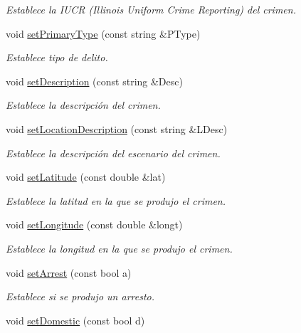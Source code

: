 \begin{DoxyCompactItemize}
\begin{DoxyCompactList}\small\item\em Establece la I\-U\-C\-R (Illinois Uniform Crime Reporting) del crimen. \end{DoxyCompactList}\item 
void \hyperlink{classcrimen_ab628dc99fbeea8d93368e0959753bfd1}{set\-Primary\-Type} (const string \&P\-Type)
\begin{DoxyCompactList}\small\item\em Establece tipo de delito. \end{DoxyCompactList}\item 
void \hyperlink{classcrimen_adf289fedce791ebe465c6b010f2d1def}{set\-Description} (const string \&Desc)
\begin{DoxyCompactList}\small\item\em Establece la descripción del crimen. \end{DoxyCompactList}\item 
void \hyperlink{classcrimen_af67c949829028c8444adc5170e5136a0}{set\-Location\-Description} (const string \&L\-Desc)
\begin{DoxyCompactList}\small\item\em Establece la descripción del escenario del crimen. \end{DoxyCompactList}\item 
void \hyperlink{classcrimen_ac29613f3156247daab4baebbcc162e15}{set\-Latitude} (const double \&lat)
\begin{DoxyCompactList}\small\item\em Establece la latitud en la que se produjo el crimen. \end{DoxyCompactList}\item 
void \hyperlink{classcrimen_a638ec127cfc3fe030bf87f8a860a076e}{set\-Longitude} (const double \&longt)
\begin{DoxyCompactList}\small\item\em Establece la longitud en la que se produjo el crimen. \end{DoxyCompactList}\item 
void \hyperlink{classcrimen_a0ef133be2f38ab05581cb7b6e067bb4a}{set\-Arrest} (const bool a)
\begin{DoxyCompactList}\small\item\em Establece si se produjo un arresto. \end{DoxyCompactList}\item 
void \hyperlink{classcrimen_a3fb6571c66f65243e230de466d66e320}{set\-Domestic} (const bool d)

\end{DoxyCompactItemize}
